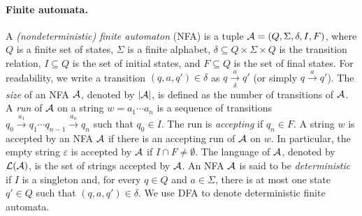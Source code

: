 \paragraph*{Finite automata.} 
A \emph{(nondeterministic) finite automaton} (NFA)  is a tuple $\mathcal{A}=(Q, \Sigma, \delta, I, F)$, where $Q$ is a finite set of states, $\Sigma$ is a finite alphabet, $\delta \subseteq Q \times \Sigma \times Q$ is the transition relation, $I \subseteq Q$ is the set of initial states, and $F \subseteq Q$ is the set of final states. For readability, we write a transition $(q, a, q') \in \delta$ as $q \xrightarrow[\delta]{a} q'$ (or simply $q \xrightarrow{a} q'$). %
The \emph{size} of an NFA $\mathcal{A}$, denoted by $|\mathcal{A}|$, is defined as the number of transitions of $\mathcal{A}$.
%
A \emph{run} of $\mathcal{A}$ on a string $w = a_1 \cdots a_n$ is a sequence of transitions $q_0 \xrightarrow{a_1} q_1 \cdots q_{n-1} \xrightarrow{a_n} q_n$ such that $q_0 \in I$. The run is \emph{accepting} if $q_n \in F$.
A string $w$ is accepted by an NFA $\mathcal{A}$ if there is an accepting run of $\mathcal{A}$ on $w$. In particular, the empty string $\varepsilon$ is accepted by $\mathcal{A}$ if $I \cap F \neq \emptyset$. The language of $\mathcal{A}$, denoted by $\mathcal{L}(\mathcal{A})$, is the set of strings accepted by $\mathcal{A}$. 
%
An NFA $\mathcal{A}$ is said to be \emph{deterministic} if $I$ is a singleton and, for every $q \in Q$ and $a \in \Sigma$, there is at most one state $q' \in Q$ such that $(q, a, q') \in \delta$. We use DFA to denote deterministic finite automata. 
%

